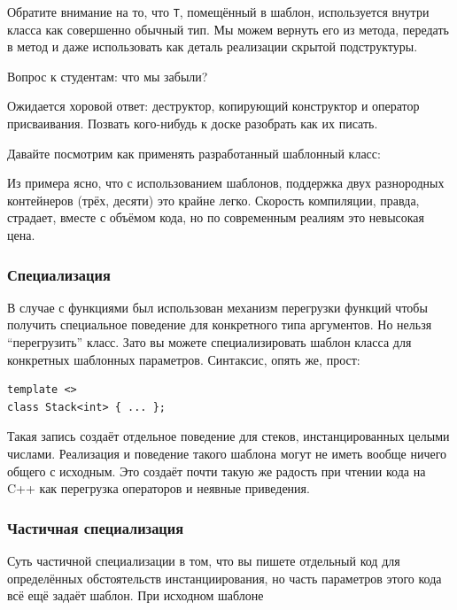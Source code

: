 \documentclass[a4paper,12pt,oneside]{article}
\begin{document}


Обратите внимание на то, что \lstinline!T!, помещённый в шаблон, используется внутри класса как совершенно обычный тип. Мы можем вернуть его из метода, передать в метод и даже использовать как деталь реализации скрытой подструктуры.



Вопрос к студентам: что мы забыли?

Ожидается хоровой ответ: деструктор, копирующий конструктор и оператор присваивания. Позвать кого-нибудь к доске разобрать как их писать.

Давайте посмотрим как применять разработанный шаблонный класс:



Из примера ясно, что с использованием шаблонов, поддержка двух разнородных контейнеров (трёх, десяти) это крайне легко. Скорость компиляции, правда, страдает, вместе с объёмом кода, но по современным реалиям это невысокая цена.

\subsubsection{Специализация}

В случае с функциями был использован механизм перегрузки функций чтобы получить специальное поведение для конкретного типа аргументов. Но нельзя ``перегрузить'' класс. Зато вы можете специализировать шаблон класса для конкретных шаблонных параметров. Синтаксис, опять же, прост:

\begin{lstlisting}
template <>
class Stack<int> { ... };
\end{lstlisting}

Такая запись создаёт отдельное поведение для стеков, инстанцированных целыми числами. Реализация и поведение такого шаблона могут не иметь вообще ничего общего с исходным. Это создаёт почти такую же радость при чтении кода на C++ как перегрузка операторов и неявные приведения.

\subsubsection{Частичная специализация}

Суть частичной специализации в том, что вы пишете отдельный код для определённых обстоятельств инстанциирования, но часть параметров этого кода всё ещё задаёт шаблон. При исходном шаблоне
\end{document}

